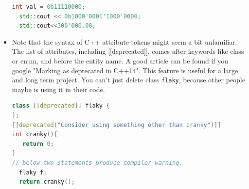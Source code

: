 \documentclass[a4paper,12pt,twoside]{book}
\begin{document}
\begin{itemize}
\begin{lstlisting}[frame=single, language=c++]
  int val = 0b11110000;
  std::cout << 0b1000'0001'1000'0000;
  std::cout<<300'000.00;
\end{lstlisting}

\item Note that the syntax of C++ attribute-tokens might seem a bit unfamiliar. The list of attributes, including [[deprecated]], comes after keywords like class or enum, and before the entity name. A good article can be found if you google "Marking as deprecated in C++14". This feature is useful for a large and long term project. You can't just delete class \texttt{flaky}, because other people maybe is using it in their code. 

\begin{lstlisting}[frame=single, language=c++]
class [[deprecated]] flaky {
};
[[deprecated("Consider using something other than cranky")]]
int cranky(){
   return 0;
}
// below two statements produce compiler warning.
  flaky f;
  return cranky();
\end{lstlisting}

\end{itemize}
\end{document}
